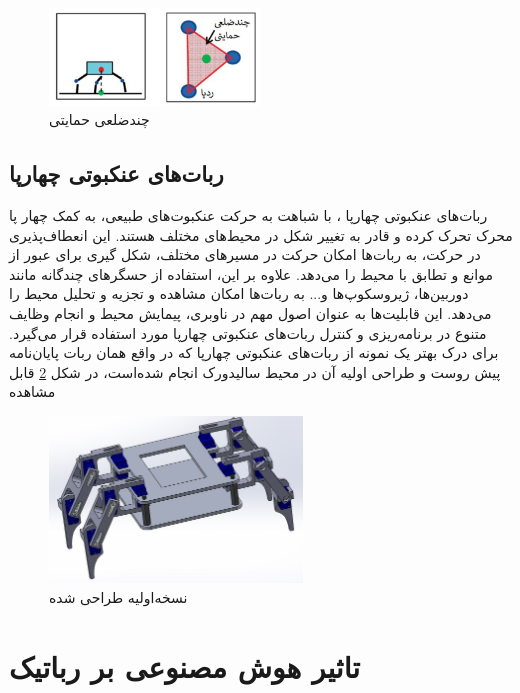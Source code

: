\begin{figure}[H]
	\centering
	\includegraphics[width=0.5\textwidth]{./images/Chapter1/StaticStability}	
	\caption[پایداری استاتیکی]{چندضلعی حمایتی \cite{StaticStability}}
	\label{پایداری استاتیکی}
\end{figure}
\noindent
\unskip



\subsection{ربات‌های عنکبوتی چهارپا}
ربات‌های عنکبوتی چهارپا
\noindent\unskip{}
، با شباهت به حرکت عنکبوت‌های طبیعی، به کمک چهار پا محرک تحرک کرده و قادر به تغییر شکل در محیط‌های مختلف هستند. این انعطاف‌پذیری در حرکت، به ربات‌ها امکان حرکت در مسیرهای مختلف، شکل گیری برای عبور از موانع و تطابق با محیط را می‌دهد. علاوه بر این، استفاده از حسگرهای چندگانه مانند دوربین‌ها، ژیروسکوپ‌ها و... به ربات‌ها امکان مشاهده و تجزیه و تحلیل محیط را می‌دهد. این قابلیت‌ها به عنوان اصول مهم در ناوبری، پیمایش محیط و انجام وظایف متنوع در برنامه‌ریزی و کنترل ربات‌های عنکبوتی چهارپا مورد استفاده قرار می‌گیرد.
برای درک بهتر یک نمونه از ربات‌های عنکبوتی چهارپا که در واقع همان ربات پایان‌نامه پیش روست و طراحی اولیه آن در محیط سالیدورک انجام شده‌است، در شکل 
\ref{نسخه‌اولیه }
قابل مشاهده

\begin{figure}[H]
	\centering
	\includegraphics[width=0.6\textwidth]{./images/Chapter1/Robot_Final}	
	\caption[نسخه‌اولیه طراحی شده]{نسخه‌اولیه طراحی شده}
	\label{نسخه‌اولیه }
\end{figure}
\noindent
\unskip

\section{تاثیر هوش مصنوعی بر رباتیک}

